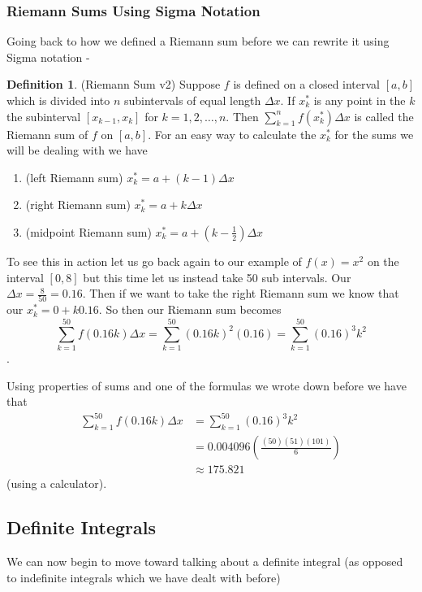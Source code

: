 \documentclass[12pt,reqno]{article}
\theoremstyle{definition}
\newtheorem*{Definition}{Definition}
\begin{document}
\subsubsection{Riemann Sums Using Sigma Notation} 

Going back to how we defined a Riemann sum before we can rewrite it using Sigma notation - 
\begin{Definition}
	(Riemann Sum v2) 	Suppose $f$ is defined on a closed interval $[a, b]$ which is divided into $n$ subintervals of equal length $\Delta x$. If $x_{k}^{*}$ is any point in the $k$the subinterval $[x_{k -1}, x_k]$ for $k = 1, 2, \ldots, n$. Then $\sum_{k = 1}^{n} f(x_{k}^{*}) \Delta x$ is called the Riemann sum of $f$ on $[a, b]$. For an easy way to calculate the $x_{k}^{*}$ for the sums we will be dealing with we have 
	\begin{enumerate}
		\item (left Riemann sum) $x_{k}^* = a + (k - 1) \Delta x$ 
		\item (right Riemann sum) $x_{k}^* = a + k\Delta x$ 
		\item (midpoint Riemann sum) $x_{k}^{*} = a + (k - \frac{1}{2})\Delta x$
	\end{enumerate}
\end{Definition}

To see this in action let us go back again to our example of $f(x) = x^2$ on the interval $[0, 8]$ but this time let us instead take 50 sub intervals. Our $\Delta x = \frac{8}{50} = 0.16$. Then if we want to take the right Riemann sum we know that our $x_{k}^{*} = 0 + k 0.16$. So then our Riemann sum becomes 
$$\sum_{k = 1}^{50} f(0.16k) \Delta x = \sum_{k = 1}^{50} (0.16 k)^2 (0.16) = \sum_{k = 1}^{50} (0.16)^3 k^2$$. 

Using properties of sums and one of the formulas we wrote down before we have that 
\begin{align*}
	\sum_{k = 1}^{50} f(0.16k) \Delta x&= \sum_{k = 1}^{50} (0.16)^3 k^2 \\
									   &= 0.004096 \left(\frac{(50)(51)(101)}{6}\right) \\
									   &\approx 175.821
\end{align*}
(using a calculator). 

\subsection{Definite Integrals}

We can now begin to move toward talking about a definite integral (as opposed to indefinite integrals which we have dealt with before)
\end{document}
